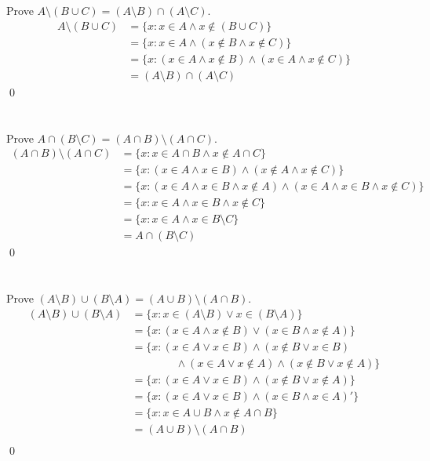 \section{}\label{sec:1-14}

Prove $A \setminus (B \cup C) = (A \setminus B) \cap (A \setminus C)$.
\hr
\begin{align*}
    A \setminus (B \cup C) &= \{x : x \in A \land x \notin (B \cup C)\} \\
    &= \{x : x \in A \land (x \notin B \land x \notin C)\} \\
    &= \{x : (x \in A \land x \notin B) \land (x \in A \land x \notin C)\} \\
    &= (A \setminus B) \cap (A \setminus C)
\end{align*}\qed

\section{}\label{sec:1-15}

Prove $A \cap (B \setminus C) = (A \cap B) \setminus (A \cap C)$.
\hr
\begin{align*}
    (A \cap B) \setminus (A \cap C) &= \{x : x \in A \cap B \land x \notin A \cap C\} \\
    &= \{x : (x \in A \land x \in B) \land (x \notin A \land x \notin C)\} \\
    &= \{x : (x \in A \land x \in B \land x \notin A) \land (x \in A \land x \in B \land x \notin C)\} \\
    &= \{x : x \in A \land x \in B \land x \notin C\} \\
    &= \{x : x \in A \land x \in B \setminus C\} \\
    &= A \cap (B \setminus C)
\end{align*}\qed

\section{}\label{sec:1-16}

Prove $(A \setminus B) \cup (B \setminus A) = (A \cup B) \setminus (A \cap B)$.
\hr
\begin{align*}
    (A \setminus B) \cup (B \setminus A) &= \{x : x \in (A \setminus B) \lor x \in (B \setminus A)\} \\
    &= \{x : (x \in A \land x \notin B) \lor (x \in B \land x \notin A)\} \\
    &= \{x : (x \in A \lor x \in B) \land (x \notin B \lor x \in B) \\
    & \qquad \qquad \land (x \in A \lor x \notin A) \land (x \notin B \lor x \notin A)\} \\
    &= \{x : (x \in A \lor x \in B) \land (x \notin B \lor x \notin A)\} \\
    &= \{x : (x \in A \lor x \in B) \land (x \in B \land x \in A)'\} \\
    &= \{x : x \in A \cup B \land x \notin A \cap B\} \\
    &= (A \cup B) \setminus (A \cap B) \\
\end{align*}\qed
\pagebreak

